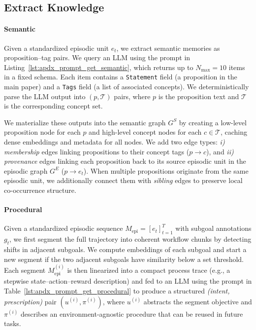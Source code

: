 {










\subsection{Extract Knowledge}
\label{app:implementation_extract_knowledge}
\paragraph{Semantic}

Given a standardized episodic unit $e_t$, we extract semantic memories as proposition--tag pairs.
We query an LLM using the prompt in Listing~\ref{lst:apdx_prompt_get_semantic}, which returns up to $N_{\max}=10$ items in a fixed schema.
Each item contains a \texttt{Statement} field (a proposition in the main paper) and a \texttt{Tags} field (a list of associated concepts).
We deterministically parse the LLM output into $(p, \mathcal{T})$ pairs, where $p$ is the proposition text and $\mathcal{T}$ is the corresponding concept set.



We materialize these outputs into the semantic graph $G^{S}$ by creating a low-level proposition node for each $p$ and high-level concept nodes for each $c \in \mathcal{T}$, caching dense embeddings and metadata for all nodes.
We add two edge types: \textit{i)} \emph{membership} edges linking propositions to their concept tags ($p \rightarrow c$), and \textit{ii)} \emph{provenance} edges linking each proposition back to its source episodic unit in the episodic graph $G^{E}$ ($p \rightarrow e_t$).
When multiple propositions originate from the same episodic unit, we additionally connect them with \emph{sibling} edges to preserve local co-occurrence structure.





\paragraph{Procedural} Given a standardized episodic sequence $M_{\mathrm{epi}}=[e_t]_{t=1}^{T}$ with subgoal annotations $g_t$, we first segment the full trajectory into coherent workflow chunks by detecting shifts in adjacent subgoals. We compute embeddings of each subgoal and start a new segment if the two adjacent subgoals have similarity below a set threshold. Each segment $M^{(i)}_{\mathrm{epi}}$ is then linearized into a compact process trace (e.g., a stepwise state--action--reward description) and fed to an LLM using the prompt in Table~\ref{lst:apdx_prompt_get_procedural} to produce a structured \emph{(intent, prescription)} pair $(u^{(i)}, \pi^{(i)})$, where $u^{(i)}$ abstracts the segment objective and $\pi^{(i)}$ describes an environment-agnostic procedure that can be reused in future tasks.

}
